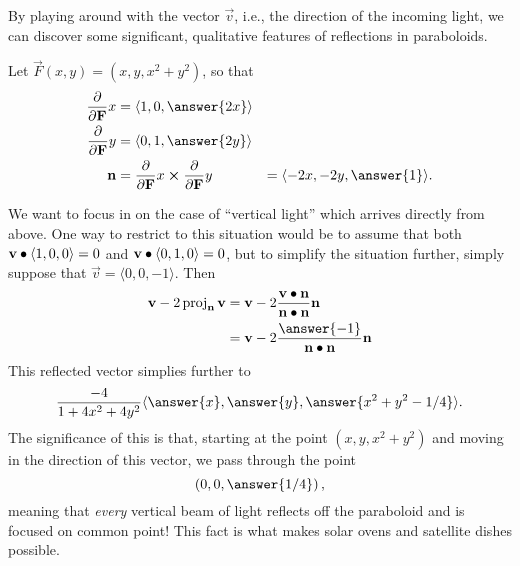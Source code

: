 \documentclass{ximera}
\begin{document}
\begin{example}
  By playing around with the vector $\vec{v}$, i.e., the direction of
  the incoming light, we can discover some significant, qualitative
  features of reflections in paraboloids.

  Let $\vec{F}(x,y) = (x,y,x^2 + y^2)$, so that
  \begin{align*}
    \pp{\vec{F}}{x} &= \langle 1, 0, \answer{2x} \rangle \\
    \pp{\vec{F}}{y} &= \langle 0, 1, \answer{2y} \rangle \\
    \vec{n} &= \pp{\vec{F}}{x} \cross \pp{\vec{F}}{y} &= \langle -2x, -2y, \answer{1} \rangle. \\
  \end{align*}

  We want to focus in on the case of ``vertical light'' which arrives directly from above.  One way to 
  restrict to this situation would be to assume that both $\mathbf{v} \bullet \langle 1, 0, 0 \rangle = 0$ and
  $\mathbf{v} \bullet \langle 0, 1, 0 \rangle = 0$, but to simplify the situation further, simply suppose
  that $\vec{v} = \langle 0, 0, -1 \rangle$.  Then
  \begin{align*}
    \vec{v} - 2 \proj_{\vec{n}} \vec{v} 
    &= \vec{v} - 2 \frac{\vec{v} \dotp \vec{n}}{\vec{n} \dotp \vec{n}} \vec{n} \\
    &= \vec{v} - 2 \frac{\answer{-1}}{\vec{n} \dotp \vec{n}} \vec{n} \\
  \end{align*}
  This reflected vector simplies further to
  \[
    \frac{-4}{1 + 4x^2 + 4y^2} \langle \answer{x}, \answer{y}, \answer{x^2 + y^2 - 1/4} \rangle.
  \]
  The significance of this is that, starting at the point
  $(x,y,x^2 + y^2)$ and moving in the direction of this vector, we pass through the point 
  \[
    \left( 0, 0, \answer{1/4} \right),
  \]
  meaning that \textit{every} vertical beam of light reflects off the
  paraboloid and is focused on common point!  This fact is what makes
  solar ovens and satellite dishes possible.
  
\end{example}
\end{document}
